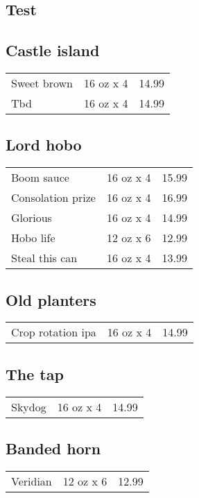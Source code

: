 \documentclass{article}%
\begin{document}
%
\pagestyle{empty}%
\normalsize%
%
\setlength{\columnseprule}{0.5pt}%
\setlength{\columnsep}{1cm}%
\renewcommand{\familydefault}{\sfdefault}%
\sffamily%
\begin{multicols}{3}%
\section*{ Test}%

%
\subsection*{Castle island}%
\begin{tabular}{l c r}%
Sweet brown&16 oz x 4&14.99\\%
Tbd&16 oz x 4&14.99\\%
\end{tabular}

%
\subsection*{Lord hobo}%
\begin{tabular}{l c r}%
Boom sauce&16 oz x 4&15.99\\%
Consolation prize&16 oz x 4&16.99\\%
Glorious&16 oz x 4&14.99\\%
Hobo life&12 oz x 6&12.99\\%
Steal this can&16 oz x 4&13.99\\%
\end{tabular}

%
\subsection*{Old planters}%
\begin{tabular}{l c r}%
Crop rotation ipa&16 oz x 4&14.99\\%
\end{tabular}

%
\subsection*{The tap}%
\begin{tabular}{l c r}%
Skydog&16 oz x 4&14.99\\%
\end{tabular}

%
\subsection*{Banded horn}%
\begin{tabular}{l c r}%
Veridian&12 oz x 6&12.99\\%
\end{tabular}


\end{multicols}
\end{document}
